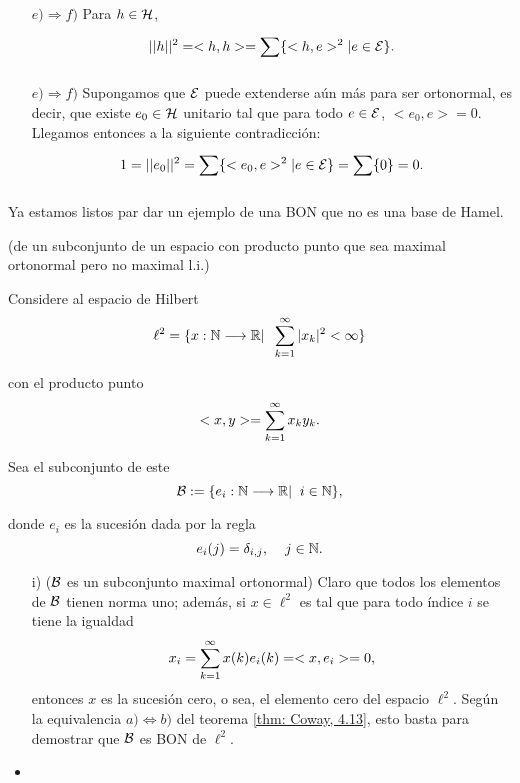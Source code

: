\begin{itemize}
\item[$e) \Rightarrow f)$] Para $h \in \mathcal{H}$,
\[
||h||^{2}=<h,h> = \sum\limits_{}^{}\{ <h,e>^{2}| e \in \mathcal{E} \}.
\]

\item[$e) \Rightarrow f)$]
Supongamos que $\mathcal{E}$ puede extenderse aún más
para ser ortonormal, es decir, que existe 
$e_{0} \in \mathcal{H}$ unitario tal que
para todo $e \in \mathcal{E}$, $<e_{0}, e>=0$. 
Llegamos entonces a la siguiente contradicción:
\[
1=||e_{0}||^{2}=\sum\limits_{}^{}\{ <e_{0}, e>^{2}| e \in \mathcal{E} \}=
\sum\limits_{}^{}\{ 0\}=0.
\]
\QEDB
\end{itemize}
\vspace{0.2cm}

Ya estamos listos par dar un ejemplo de una BON que
no es una base de Hamel.

\begin{ejemplo}
(de un subconjunto de un espacio
con producto punto que sea maximal ortonormal pero no maximal l.i.)

Considere al espacio de Hilbert
\[
\ell^{2}= \{ x: \mathbb{N} \longrightarrow \mathbb{R} | \hspace{0.2cm} 
\sum\limits_{k=1}^{\infty}|x_{k}|^{2}< \infty \}
\]

con el producto punto
\[
<x,y>= \sum\limits_{k=1}^{\infty}x_{k}y_{k}.
\]

Sea el subconjunto de este
\[
\mathcal{B}:= \{e_{i}: \mathbb{N} \longrightarrow \mathbb{R}| \hspace{0.2cm} i \in \mathbb{N} \},
\]

donde $e_{i}$ es la sucesión dada por la regla
\[
e_{i}(j)=\delta_{i,j}, \hspace{0.4cm} j \in \mathbb{N}.
\]


\begin{itemize}
\item[i)]($\mathcal{B}$ es un subconjunto maximal ortonormal) 
Claro que todos los elementos de $\mathcal{B}$ tienen norma uno;
además, si $x \in \ell^{2}$ es tal que para todo índice $i$
se tiene la igualdad
\[
x_{i}= \sum\limits_{k=1}^{\infty}x(k)e_{i}(k)=<x,e_{i}>=0,
\]
entonces $x$ es la sucesión cero, o sea,
el elemento cero del espacio
$\ell^{2}$. Según la equivalencia
$a) \iff b)$ del teorema \ref{thm: Coway, 4.13}, esto basta
para demostrar que $\mathcal{B}$ es BON de $\ell^{2}$.

\item

\end{itemize}



\end{ejemplo}

